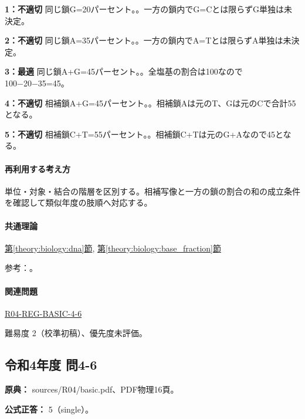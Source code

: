 \noindent\textbf{1：不適切} 同じ鎖G=\allowbreak{}20パーセント。。一方の鎖内でG=\allowbreak{}Cとは限らずG単独は未決定。\par

\noindent\textbf{2：不適切} 同じ鎖A=\allowbreak{}35パーセント。。一方の鎖内でA=\allowbreak{}Tとは限らずA単独は未決定。\par

\noindent\textbf{3：最適} 同じ鎖A+G=\allowbreak{}45パーセント。。全塩基の割合は100なので100−20−35=\allowbreak{}45。\par

\noindent\textbf{4：不適切} 相補鎖A+G=\allowbreak{}45パーセント。。相補鎖Aは元のT、Gは元のCで合計55となる。\par

\noindent\textbf{5：不適切} 相補鎖C+T=\allowbreak{}55パーセント。。相補鎖C+Tは元のG+Aなので45となる。\par

\paragraph{再利用する考え方} 単位・対象・結合の階層を区別する。相補写像と一方の鎖の割合の和の成立条件を確認して類似年度の肢順へ対応する。

\paragraph{共通理論} \hyperref[theory:biology:dna]{第\ref*{theory:biology:dna}節}, \hyperref[theory:biology:base_fraction]{第\ref*{theory:biology:base_fraction}節}

\par 参考：\cite{nhgri_dna}。

\paragraph{関連問題} \hyperref[q:r04-reg-basic-4-6]{R04-REG-BASIC-4-6}

\par 難易度 2（校準初稿）、優先度未評価。

\subsection{令和4年度 問4-6}
\label{q:r04-reg-basic-4-6}

\noindent\textbf{原典：} sources/R04/basic.pdf、PDF物理16頁。

\textbf{公式正答：} 5（single）。

